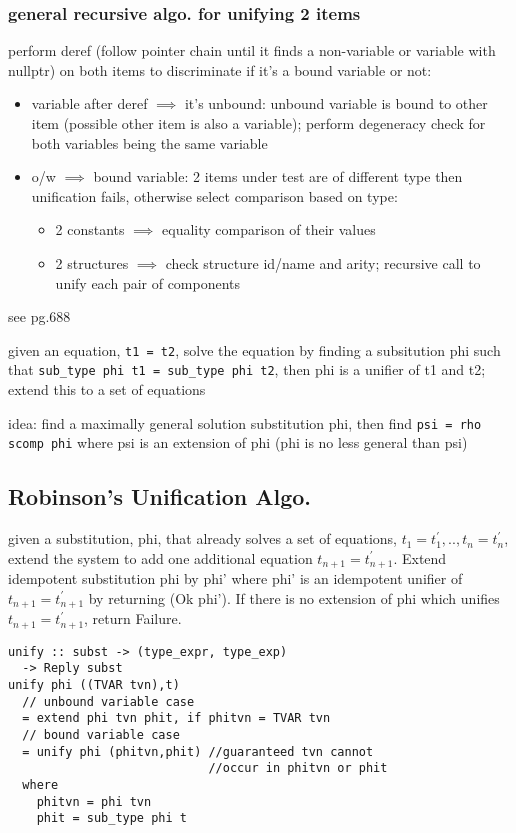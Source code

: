 \documentclass[8pt]{extarticle}
\begin{document}
\begin{multicols*}{2}
\subsubsection{general recursive algo. for unifying 2 items}
perform deref (follow pointer chain until it finds a non-variable or variable with nullptr) on both items to discriminate if it's a bound variable or not:
\begin{itemize}
\item variable after deref $\implies$ it's unbound: unbound variable is bound to other item (possible other item is also a variable); perform degeneracy check for both variables being the same variable
\item o/w $\implies$ bound variable: 2 items under test are of different type then unification fails, otherwise select  comparison based on type:
  \begin{itemize}
    \item 2 constants $\implies$ equality comparison of their values
    \item 2 structures $\implies$ check structure id/name and arity; recursive call to unify each pair of components
  \end{itemize}
\end{itemize}

see \cite{grune2012} pg.688

given an equation, \verb|t1 = t2|, solve the equation by finding a subsitution phi such that \verb|sub_type phi t1 = sub_type phi t2|, then phi is a unifier of t1 and t2; extend this to a set of equations

idea: find a maximally general solution substitution phi, then find \verb|psi = rho scomp phi| where psi is an extension of phi (phi is no less general than psi)

\vfill\null
\columnbreak

\subsection{Robinson's Unification Algo.}
given a substitution, phi, that already solves a set of equations, $t_1=t_1^{\prime}, .., t_n=t_n^{\prime}$, extend the system to add one additional equation $t_{n+1}=t_{n+1}^{\prime}$. Extend idempotent substitution phi by phi' where phi' is an idempotent unifier of $t_{n+1}=t_{n+1}^{\prime}$ by returning (Ok phi'). If there is no extension of phi which unifies $t_{n+1}=t_{n+1}^{\prime}$, return Failure.

\begin{verbatim}
unify :: subst -> (type_expr, type_exp)
  -> Reply subst
unify phi ((TVAR tvn),t)
  // unbound variable case
  = extend phi tvn phit, if phitvn = TVAR tvn
  // bound variable case
  = unify phi (phitvn,phit) //guaranteed tvn cannot
                            //occur in phitvn or phit
  where
    phitvn = phi tvn
    phit = sub_type phi t


\end{verbatim}
\end{multicols*}
\end{document}
